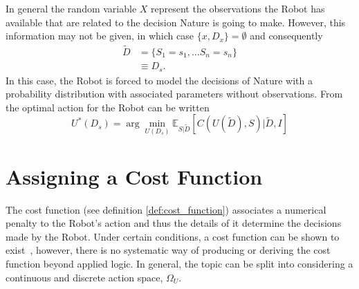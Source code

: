 \begin{example}
	In general the random variable $X$ represent the observations the Robot has available that are related to the decision Nature is going to make. However, this information may not be given, in which case $\{x,D_x\}=\emptyset$ and consequently
	\begin{equation}
		\begin{split}
			\tilde{D} &= \{S_1 =s_1,\dots S_n=s_n\}\\
			&\equiv D_s.
		\end{split}
	\end{equation}
	In this case, the Robot is forced to model the decisions of Nature with a probability distribution with associated parameters without observations. From  the optimal action for the Robot can be written
	\begin{equation}
		U^*(D_s) = \arg\min_{U(D_s)} \mathbb{E}_{S|\tilde{D}}[C(U(\tilde{D}), S)|\tilde{D},I]
		\label{eq:best_decision1}
	\end{equation}
\end{example}

\section{Assigning a Cost Function}
\label{sec:assing_cost}
The cost function (see definition \ref{def:cost_function}) associates a numerical penalty to the Robot's action and thus the details of it determine the decisions made by the Robot. Under certain conditions, a cost function can be shown to exist~\citep{lavalle2006planning}, however, there is no systematic way of producing or deriving the cost function beyond applied logic. In general, the topic can be split into considering a continuous and discrete action space, $\Omega_U$. 	

